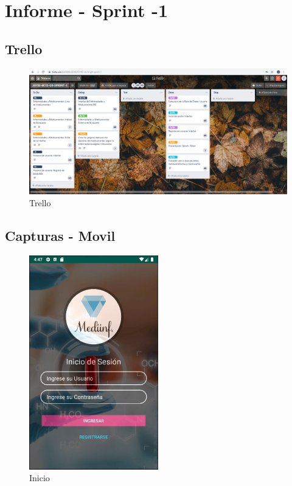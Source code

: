 
\chapter{Informe - Sprint -1}

\section{Trello}

\begin{figure}[H]
	\centering
	\includegraphics[width=1.20\textwidth]{img/Captura1}\par
	\caption{Trello}
	\label{Fig:figura1}
\end{figure}

\section{Capturas - Movil}	
\begin{figure}[H]
\centering
	\includegraphics[width=0.50\textwidth]{img/Captura2}\par
		\caption{Inicio}
	\label{Fig:figura2}
\end{figure}

